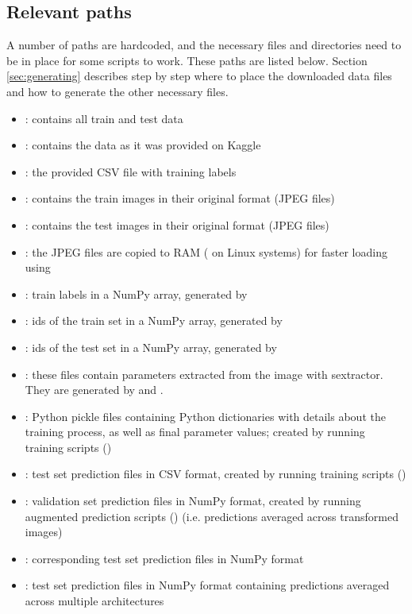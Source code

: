 \documentclass[a4paper,10pt]{article}
\begin{document}
\subsection{Relevant paths}
\label{sec:paths}
A number of paths are hardcoded, and the necessary files and directories need to be in place for some scripts to work. These paths are listed below. Section \ref{sec:generating} describes step by step where to place the downloaded data files and how to generate the other necessary files.

\begin{itemize}
 \item {}: contains all train and test data
 \item {}: contains the data as it was provided on Kaggle
 \item {}: the provided CSV file with training labels
 \item {}: contains the train images in their original format (JPEG files)
 \item {}: contains the test images in their original format (JPEG files)
 \item {}: the JPEG files are copied to RAM ( on Linux systems) for faster loading using 
 \item {}: train labels in a NumPy array, generated by 
 \item {}: ids of the train set in a NumPy array, generated by 
 \item {}: ids of the test set in a NumPy array, generated by 
 \item {}: these files contain parameters extracted from the image with sextractor. They are generated by  and .
 \item {}: Python pickle files containing Python dictionaries with details about the training process, as well as final parameter values; created by running training scripts ()
 \item {}: test set prediction files in CSV format, created by running training scripts ()
 \item {}: validation set prediction files in NumPy format, created by running augmented prediction scripts () (i.e. predictions averaged across transformed images)
 \item {}: corresponding test set prediction files in NumPy format
 \item {}: test set prediction files in NumPy format containing predictions averaged across multiple architectures
\end{itemize}
\end{document}
